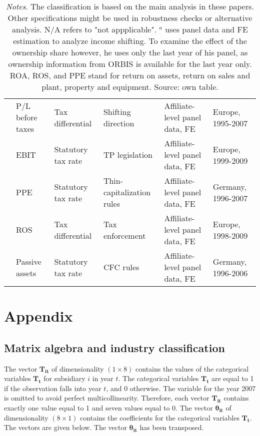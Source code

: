 \documentclass[10pt,twocolumn,oneside,cmyk]{article}
\begin{document}
\begin{sidewaystable}
\begin{center}
\begin{tabularx}{\textwidth}{l l l l l l}
   \textcite{dischinger_role_2014} &P/L before taxes &Tax differential &Shifting direction &Affiliate-level panel data, FE &Europe, 1995-2007\\
   \textcite{lohse_impact_2012} &EBIT &Statutory tax rate &TP legislation &Affiliate-level panel data, FE &Europe, 1999-2009\\
   \textcite{buettner_anti_2017} &PPE &Statutory tax rate &Thin-capitalization rules &Affiliate-level panel data, FE &Germany, 1996-2007\\
   \textcite{beuselinck_cross-jurisdictional_2015} &ROS &Tax differential &Tax enforcement &Affiliate-level panel data, FE &Europe, 1998-2009\\
   \textcite{ruf_taxation_2012} &Passive assets &Statutory tax rate &CFC rules &Affiliate-level panel data, FE &Germany, 1996-2006\\
   \bottomrule
   \end{tabularx}
  \caption*{\footnotesize{\textit{Notes}. The classification is based on the main analysis in these papers. Other specifications might be used in robustness checks or alternative analysis. N/A refers to "not appplicable". $^a$\textcite{dischinger_profit_2008} uses panel data and FE estimation to analyze income shifting. To examine the effect of the ownership share however, he uses only the last year of his panel, as ownership information from ORBIS is available for the last year only. ROA, ROS, and PPE stand for return on assets, return on sales and plant, property and equipment. Source: own table.}}
 \end{center}
\end{sidewaystable}


\section{Appendix }\label{app:B}
\subsection{Matrix algebra and industry classification}\label{app:B1}
The vector $\bm{T_{it}}$ of dimensionality $(1\times8)$ contains the values of the categorical variables $\bm{T_t}$ for subsidiary $i$ in year $t$. The categorical variables $\bm{T_t}$ are equal to 1 if the observation falls into year $t$, and 0 otherwise. The variable for the year 2007 is omitted to avoid perfect multicollinearity. Therefore, each vector $\bm{T_{it}}$ contains exactly one value equal to 1 and seven values equal to 0. The vector $\bm{\theta_{it}}$ of dimensionality $(8\times1)$ contains the coefficients for the categorical variables $\bm{T_t}$. The vectors are given below. The vector $\bm{\theta_{it}}$ has been transposed.
\end{document}
